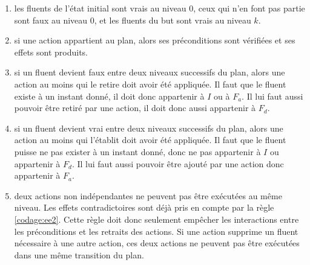 {\begin{enumerate}
\item {} les fluents de l'état initial sont vrais au
  niveau $0$, ceux qui n'en font pas partie sont faux au niveau $0$, et les
  fluents du but sont vrais au niveau $k$.
\item \label{codage:ee2}  si une
  action appartient au plan, alors ses préconditions sont vérifiées et
  ses effets sont produits.
\item \label{codage:ee3}  si un
  fluent devient faux entre deux niveaux successifs du plan, alors une action au
  moins qui le retire doit avoir été appliquée. Il faut que le fluent existe à
  un instant donné, il doit donc appartenir à $I$ ou à $F_a$. Il lui faut aussi
  pouvoir être retiré par une action, il doit donc aussi appartenir à $F_d$.
\item \label{codage:ee4}  si un
  fluent devient vrai entre deux niveaux successifs du plan, alors une action au
  moins qui l'établit doit avoir été appliquée.  Il faut que le fluent puisse ne
  pas exister à un instant donné, donc ne pas appartenir à $I$ ou appartenir à
  $F_d$. Il lui faut aussi pouvoir être ajouté par une action donc appartenir à
  $F_a$.
\item \label{codage:ee5}  deux actions non
  indépendantes ne peuvent pas être exécutées au même niveau. Les effets
  contradictoires sont déjà pris en compte par la règle \ref{codage:ee2}.
Cette règle doit donc seulement empêcher les interactions entre les préconditions et les retraits des actions. Si une action supprime un fluent nécessaire à une autre action, ces deux actions ne peuvent pas être exécutées dans une même transition du plan.


\end{enumerate}}
